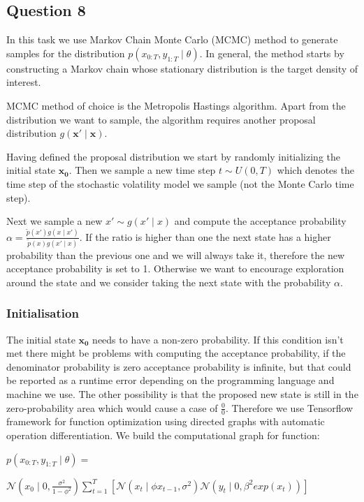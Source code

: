 \documentclass[]{article}
\begin{document}
\subsection*{Question 8}
In this task we use Markov Chain Monte Carlo (MCMC) method to generate samples for the distribution $p(x_{0:T}, y_{1:T} \mid \theta)$. In general, the method starts by constructing a Markov chain whose stationary distribution is the target density of interest. 

MCMC method of choice is the Metropolis Hastings algorithm.
Apart from the distribution we want to sample, the algorithm requires another proposal distribution $g(\mathbf{x'} \mid \mathbf{x})$.


Having defined the proposal distribution we start by randomly initializing the initial state $\mathbf{x_0}$. Then we sample a new time step $ t \sim U(0,T)$ which denotes the time step of the stochastic volatility model we sample (not the Monte Carlo time step). 

Next we sample a new $x' \sim g(x' \mid x)$ and compute the acceptance probability $ \alpha = \frac{ \widetilde{p}(x')g(x \mid x') }{  \widetilde{p}(x)g(x' \mid x) }$. If the ratio is higher than one the next state has a higher probability than the previous one and we will always take it, therefore the new acceptance probability is set to 1. Otherwise we want to encourage exploration around the state and we consider taking the next state with the probability $\alpha$.  

\subsubsection*{Initialisation}

The initial state $\mathbf{x_0}$ needs to have a non-zero probability. If this condition isn't met there might be problems with computing the acceptance probability, if the denominator probability is zero acceptance probability is infinite, but that could be reported as a runtime error depending on the programming language and machine we use. The other possibility is that the proposed new state is still in the zero-probability area which would cause a case of $\frac{0}{0}$. Therefore we use Tensorflow framework for function optimization using directed graphs with automatic operation differentiation. We build the computational graph for function:

$ p(x_{0:T}, y_{1:T} \mid \theta) = $

$ \mathcal{N}( x_0 \mid 0, \frac{\sigma^2}{1- \phi^2}) \sum_{t=1}^T [ \mathcal{N}(x_t \mid \phi x_{t-1},\sigma^2 ) \mathcal{N}(y_t \mid 0, \beta^2 exp(x_t))] 
$
\end{document}

